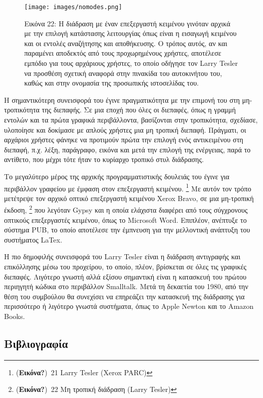 \documentclass[
]{article}
\begin{document}
\leavevmode{}%
\begin{figure}
\hypertarget{fig:nomodes}{%
\centering
\texttt{[image: images/nomodes.png]}
\caption{Εικόνα 22: Η διάδραση με έναν επεξεργαστή κειμένου γινόταν
αρχικά με την επιλογή κατάστασης λειτουργίας όπως είναι η εισαγωγή
κειμένου και οι εντολές αναζήτησης και αποθήκευσης. Ο τρόπος αυτός, αν
και παραμένει αποδεκτός από τους προχωρημένους χρήστες, αποτέλεσε
εμπόδιο για τους αρχάριους χρήστες, το οποίο οδήγησε τον Larry Tesler να
προσθέση σχετική αναφορά στην πινακίδα του αυτοκινήτου του, καθώς και
στην ονομασία της προσωπικής ιστοσελίδας του.}\label{fig:nomodes}
}
\end{figure}

Η σημαντικότερη συνεισφορά του έγινε πραγματικότητα με την επιμονή του
στη μη-τροπικότητα της διεπαφής. Σε μια εποχή που όλες οι διεπαφές, όπως
η γραμμή εντολών και τα πρώτα γραφικά περιβάλλοντα, βασίζονται στην
τροπικότητα, σχεδίασε, υλοποίησε και δοκίμασε με απλούς χρήστες μια μη
τροπική διεπαφή. Πράγματι, οι αρχάριοι χρήστες φάνηκε να προτιμούν πρώτα
την επιλογή ενός αντικειμένου στη διεπαφή, π.χ. λέξη, παράγραφο, εικόνα
και μετά την επιλογή της ενέργειας, παρά το αντίθετο, που μέχρι τότε
ήταν το κυρίαρχο τροπικό στυλ διάδρασης.

Το μεγαλύτερο μέρος της αρχικής προγραμματιστικής δουλειάς του έγινε για
περιβάλλον γραφείου με έμφαση στον επεξεργαστή κειμένου. \footnote{(\textbf{Εικόνα?})~21
  Larry Tesler (Xerox PARC)} Με αυτόν τον τρόπο μετέτρεψε τον αρχικό
οπτικό επεξεργαστή κειμένου Xerox Bravo, σε μια μη-τροπική έκδοση,
\footnote{(\textbf{Εικόνα?})~22 Μη τροπική διάδραση (Larry Tesler)} που
λεγόταν Gypsy και η οποία ελάχιστα διαφέρει από τους σύγχρονους οπτικούς
επεξεργαστές κειμένου, όπως το Microsoft Word. Επιπλέον, ανέπτυξε το
σύστημα PUΒ, το οποίο αποτέλεσε την έμπνευση για την μελλοντική ανάπτυξη
του συστήματος LaTex.

Η πιο δημοφιλής συνεισφορά του Larry Tesler είναι η διάδραση αντιγραφής
και επικόλλησης μέσω του προχείρου, το οποίο, πλέον, βρίσκεται σε όλες
τις γραφικές διεπαφές. Λιγότερο γνωστή αλλά εξίσου σημαντική είναι η
κατασκευή του πρώτου περιηγητή κώδικα στο περιβάλλον Smalltalk. Μετά τη
δεκαετία του 1980, από την θέση του συμβούλου θα συνεχίσει να επηρεάζει
την κατασκευή της διάδρασης για περισσότερο ή λιγότερο γνωστά συστήματα,
όπως το Apple Newton και το Amazon Books.

\hypertarget{ux3b2ux3b9ux3b2ux3bbux3b9ux3bfux3b3ux3c1ux3b1ux3c6ux3afux3b1}{%
\subsection*{Βιβλιογραφία}\label{ux3b2ux3b9ux3b2ux3bbux3b9ux3bfux3b3ux3c1ux3b1ux3c6ux3afux3b1}}
\end{document}
